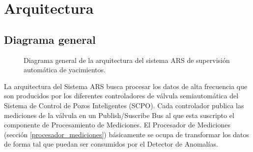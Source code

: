 \documentclass{article}
\theoremstyle{definition}
\theoremstyle{remark}
\begin{document}
\pagebreak

\section{Arquitectura}

\subsection{Diagrama general}

\begin{figure}[H]
  \caption{Diagrama general de la arquitectura del sistema ARS de supervisión automática de yacimientos.}
\end{figure}

La arquitectura del Sistema ARS busca procesar los datos de alta frecuencia que son producidos por los diferentes controladores de válvula semiautomática del Sistema de Control de Pozos Inteligentes (SCPO). Cada controlador publica las mediciones de la válvula en un Publish/Suscribe Bus al que esta suscripto el componente de Procesamiento de Mediciones. El Procesador de Mediciones (sección \ref{procesador_mediciones}) básicamente se ocupa de transformar los datos de forma tal que puedan ser consumidos por el Detector de Anomalías.
\end{document}
